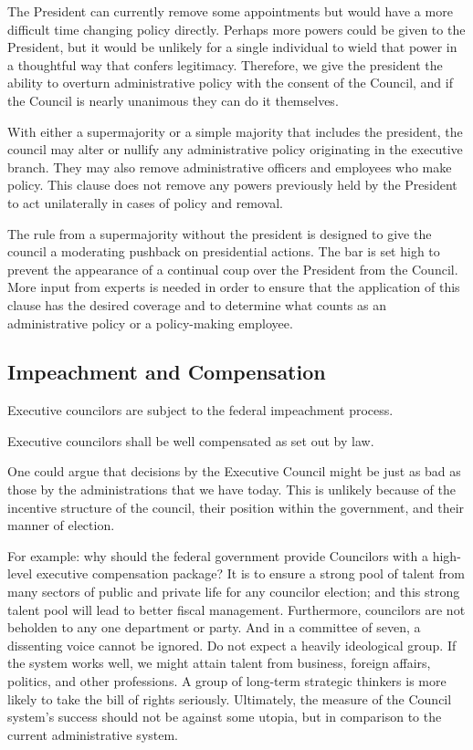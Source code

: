 \documentclass{article}
\begin{document}
The President can currently remove some appointments but would have a more difficult time changing policy directly\cite{Fairlie}. Perhaps more powers could be given to the President, but it would be unlikely for a single individual to wield that power in a thoughtful way that confers legitimacy. Therefore, we give the president the ability to overturn administrative policy with the consent of the Council, and if the Council is nearly unanimous they can do it themselves.

\begin{quoting}
With either a supermajority or a simple majority that includes the president, the council may alter or nullify any administrative policy originating in the executive branch. They may also remove administrative officers and employees who make policy. This clause does not remove any powers previously held by the President to act unilaterally in cases of policy and removal.
\end{quoting}

The rule from a supermajority without the president is designed to give the council a moderating pushback on presidential actions. The bar is set high to prevent the appearance of a continual coup over the President from the Council. More input from experts is needed in order to ensure that the application of this clause has the desired coverage and to determine what counts as an administrative policy or a policy-making employee.

\subsection{Impeachment and Compensation}

\begin{quoting}
Executive councilors are subject to the federal impeachment process.

Executive councilors shall be well compensated as set out by law.
\end{quoting}

One could argue that decisions by the Executive Council might be just as bad as those by the administrations that we have today. This is unlikely because of the incentive structure of the council, their position within the government, and their manner of election.

For example: why should the federal government provide Councilors with a high-level executive compensation package? It is to ensure a strong pool of talent from many sectors of public and private life for any councilor election; and this strong talent pool will lead to better fiscal management. Furthermore, councilors are not beholden to any one department or party. And in a committee of seven, a dissenting voice cannot be ignored. Do not expect a heavily ideological group. If the system works well, we might attain talent from business, foreign affairs, politics, and other professions. A group of long-term strategic thinkers is more likely to take the bill of rights seriously. Ultimately, the measure of the Council system's success should not be against some utopia, but in comparison to the current administrative system.
\end{document}
